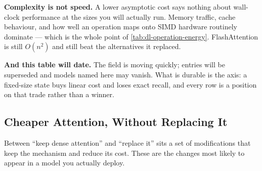 \begin{cautionbox}
\textbf{Complexity is not speed.} A lower asymptotic cost says nothing about
wall-clock performance at the sizes you will actually run. Memory traffic,
cache behaviour, and how well an operation maps onto SIMD hardware routinely
dominate --- which is the whole point of
\cref{tab:dl-operation-energy}. FlashAttention is still $O(n^2)$ and still
beat the alternatives it replaced.

\textbf{And this table will date.} The field is moving quickly; entries will be
superseded and models named here may vanish. What is durable is the axis: a
fixed-size state buys linear cost and loses exact recall, and every row is a
position on that trade rather than a winner.
\end{cautionbox}

\subsection{Cheaper Attention, Without Replacing It}

Between ``keep dense attention'' and ``replace it'' sits a set of
modifications that keep the mechanism and reduce its cost. These are the
changes most likely to appear in a model you actually deploy.

